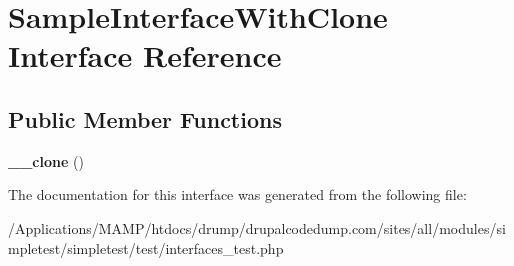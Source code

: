 \hypertarget{interface_sample_interface_with_clone}{
\section{SampleInterfaceWithClone Interface Reference}
\label{interface_sample_interface_with_clone}
}
\subsection*{Public Member Functions}
\begin{DoxyCompactItemize}
\item 
\hypertarget{interface_sample_interface_with_clone_a0b33fa3fa070be31c23cbffc2b845aab}{
{\bfseries \_\-\_\-clone} ()}
\label{interface_sample_interface_with_clone_a0b33fa3fa070be31c23cbffc2b845aab}

\end{DoxyCompactItemize}


The documentation for this interface was generated from the following file:\begin{DoxyCompactItemize}
\item 
/Applications/MAMP/htdocs/drump/drupalcodedump.com/sites/all/modules/simpletest/simpletest/test/interfaces\_\-test.php\end{DoxyCompactItemize}
